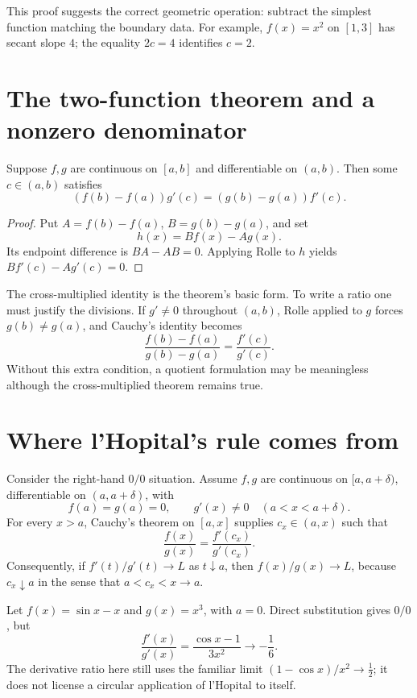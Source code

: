 This proof suggests the correct geometric operation: subtract the simplest function matching the boundary data. For example, \(f(x)=x^2\) on \([1,3]\) has secant slope \(4\); the equality \(2c=4\) identifies \(c=2\).

\section{The two-function theorem and a nonzero denominator}

\begin{theorem}
Suppose \(f,g\) are continuous on \([a,b]\) and differentiable on \((a,b)\). Then some \(c\in(a,b)\) satisfies
\[
  (f(b)-f(a))g'(c)=(g(b)-g(a))f'(c).
\]
\end{theorem}
\begin{proof}
Put \(A=f(b)-f(a)\), \(B=g(b)-g(a)\), and set
\[
  h(x)=Bf(x)-Ag(x).
\]
Its endpoint difference is \(BA-AB=0\). Applying Rolle to \(h\) yields \(Bf'(c)-Ag'(c)=0\).
\end{proof}

The cross-multiplied identity is the theorem's basic form. To write a ratio one must justify the divisions. If \(g'\ne0\) throughout \((a,b)\), Rolle applied to \(g\) forces \(g(b)\ne g(a)\), and Cauchy's identity becomes
\[
  \frac{f(b)-f(a)}{g(b)-g(a)}
  =\frac{f'(c)}{g'(c)}.
\]
Without this extra condition, a quotient formulation may be meaningless although the cross-multiplied theorem remains true.

\section{Where l'Hopital's rule comes from}

Consider the right-hand \(0/0\) situation. Assume \(f,g\) are continuous on \([a,a+\delta)\), differentiable on \((a,a+\delta)\), with
\[
  f(a)=g(a)=0,\qquad g'(x)\ne0\quad(a<x<a+\delta).
\]
For every \(x>a\), Cauchy's theorem on \([a,x]\) supplies \(c_x\in(a,x)\) such that
\[
  \frac{f(x)}{g(x)}=\frac{f'(c_x)}{g'(c_x)}.
\]
Consequently, if \(f'(t)/g'(t)\to L\) as \(t\downarrow a\), then \(f(x)/g(x)\to L\), because \(c_x\downarrow a\) in the sense that \(a<c_x<x\to a\).

\begin{example}
Let \(f(x)=\sin x-x\) and \(g(x)=x^3\), with \(a=0\). Direct substitution gives \(0/0\), but
\[
 \frac{f'(x)}{g'(x)}
 =\frac{\cos x-1}{3x^2}\longrightarrow-\frac16.
\]
The derivative ratio here still uses the familiar limit \((1-\cos x)/x^2\to\tfrac12\); it does not license a circular application of l'Hopital to itself.
\end{example}

